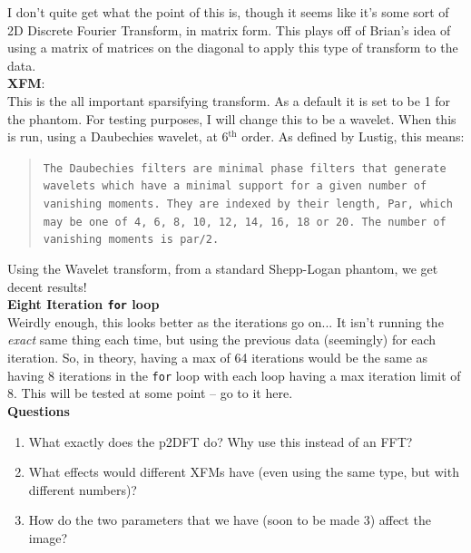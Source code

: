 \documentclass[11 pt]{article}
\newcommand{\bo}{\noindent\textbf}
\begin{document}
        I don't quite get what the point of this is, though it seems like it's some sort of 2D Discrete Fourier Transform, in matrix form. This plays off of Brian's idea of using a matrix of matrices on the diagonal to apply this type of transform to the data.\\

      \bo{XFM}:\\
        This is the all important sparsifying transform. As a default it is set to be 1 for the phantom. For testing purposes, I will change this to be a wavelet. When this is run, using a Daubechies wavelet, at 6$^{\text{th}}$ order. As defined by Lustig, this means:

        \begin{quote}
       \texttt{The Daubechies filters are minimal phase filters that generate wavelets which have a minimal support for a given number of vanishing moments. They are indexed by their length, Par, which may be one of 4, 6, 8, 10, 12, 14, 16, 18 or 20. The number of vanishing moments is par/2.}
       \end{quote}

        \noindent Using the Wavelet transform, from a standard Shepp-Logan phantom, we get decent results! \\

      \bo{Eight Iteration \texttt{for} loop}\\

        Weirdly enough, this looks better as the iterations go on... It isn't running the \emph{exact} same thing each time, but using the previous data (seemingly) for each iteration. So, in theory, having a max of 64 iterations would be the same as having 8 iterations in the \texttt{for} loop with each loop having a max iteration limit of 8. This will be tested at some point -- go to it here. \\


      \newpage
      \bo{Questions}

        \begin{enumerate}
          \item What exactly does the p2DFT do? Why use this instead of an FFT?
          \item What effects would different XFMs have (even using the same type, but with different numbers)?
          \item How do the two parameters that we have (soon to be made 3) affect the image?
          \end{enumerate}
\end{document}
